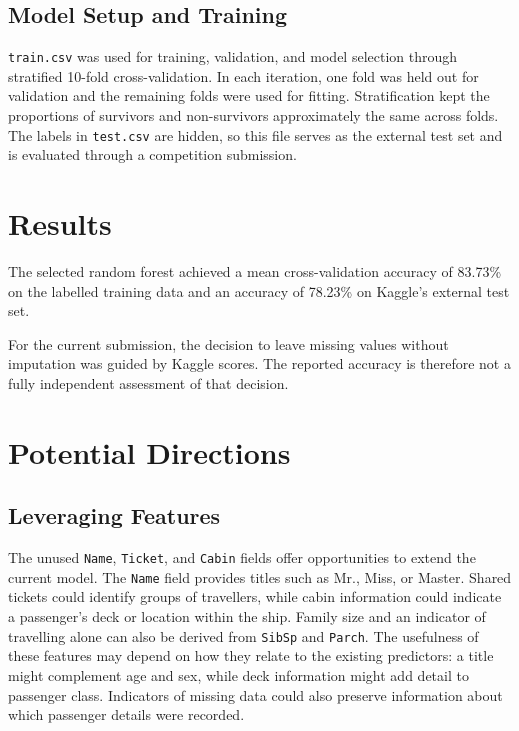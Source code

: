 \documentclass[11pt,a4paper]{article}
\begin{document}
\subsection{Model Setup and Training}

\texttt{train.csv} was used for training, validation, and model selection through stratified 10-fold cross-validation. In each iteration, one fold was held out for validation and the remaining folds were used for fitting. Stratification kept the proportions of survivors and non-survivors approximately the same across folds. The labels in \texttt{test.csv} are hidden, so this file serves as the external test set and is evaluated through a competition submission.



\section{Results}

The selected random forest achieved a mean cross-validation accuracy of 83.73\% on the labelled training data and an accuracy of 78.23\% on Kaggle's external test set.

For the current submission, the decision to leave missing values without imputation was guided by Kaggle scores. The reported accuracy is therefore not a fully independent assessment of that decision.


\section{Potential Directions}

\subsection{Leveraging Features}

The unused \texttt{Name}, \texttt{Ticket}, and \texttt{Cabin} fields offer opportunities to extend the current model. The \texttt{Name} field provides titles such as Mr., Miss, or Master. Shared tickets could identify groups of travellers, while cabin information could indicate a passenger's deck or location within the ship. Family size and an indicator of travelling alone can also be derived from \texttt{SibSp} and \texttt{Parch}. The usefulness of these features may depend on how they relate to the existing predictors: a title might complement age and sex, while deck information might add detail to passenger class. Indicators of missing data could also preserve information about which passenger details were recorded.
\end{document}
